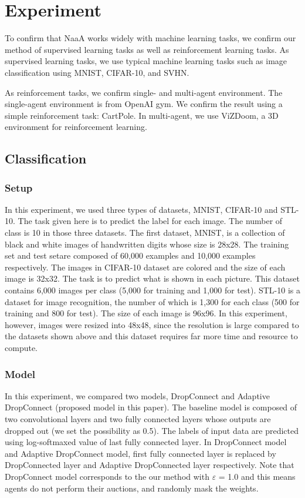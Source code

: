 \section{Experiment}
To confirm that NaaA works widely with machine learning tasks,
we confirm our method of supervised learning tasks as well as reinforcement learning tasks.
As supervised learning tasks, we use typical machine learning tasks such as image classification
using MNIST, CIFAR-10, and SVHN.

As reinforcement tasks, we confirm single- and multi-agent environment.
The single-agent environment is from OpenAI gym.
We confirm the result using a simple reinforcement task: CartPole.
In multi-agent, we use ViZDoom, a 3D environment for reinforcement learning.

\subsection{Classification}

\subsubsection{Setup}
In this experiment, we used three types of datasets, MNIST, CIFAR-10 and STL-10. The task given here is to predict the label for each image. The number of class is 10 in those three datasets.
The first dataset, MNIST, is a collection of black and white images of handwritten digits whose size is 28x28. The training set and test setare composed of 60,000 examples and 10,000 examples respectively. 
The images in CIFAR-10 dataset are colored and the size of each image is 32x32. The task is to predict what is shown in each picture. This dataset contains 6,000 images per class (5,000 for training and 1,000 for test).
STL-10 is a dataset for image recognition, the number of which is 1,300 for each class (500 for training and 800 for test). The size of each image is 96x96. In this experiment, however, images were resized into 48x48, since the resolution is large compared to the datasets shown above and this dataset requires far more time and resource to compute.

\subsubsection{Model}
In this experiment, we compared two models, DropConnect and Adaptive DropConnect (proposed model in this paper). The baseline model is composed of two convolutional layers and two fully connected layers whose outputs are dropped out (we set the possibility as 0.5). The labels of input data are predicted using log-softmaxed value of last fully connected layer. In DropConnect model and Adaptive DropConnect model, first fully connected layer is replaced by DropConnected layer  and Adaptive DropConnected layer respectively. Note that DropConnect model corresponds to the our method with $\varepsilon$ = 1.0 and this means agents do not perform their auctions, and randomly mask the weights.

